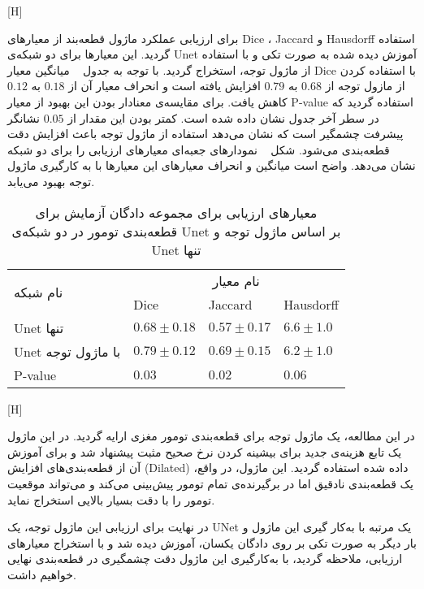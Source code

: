 [H]

برای ارزیابی عملکرد ماژول قطعه‌بند از معیارهای Dice ، Jaccard و Hausdorff استفاده گردید. این معیارها برای دو شبکه‌ی Unet آموزش دیده شده به صورت تکی و با استفاده از ماژول توجه، استخراج گردید. با توجه به جدول ~ میانگین معیار Dice با استفاده کردن از مازول توجه از $0.68$ به $0.79$ افزایش یافته است و انحراف معیار آن از $0.18$ به $0.12$ کاهش یافت. برای مقایسه‌ی معنادار بودن این بهبود از معیار P-value استفاده گردید که در سطر آخر جدول نشان داده شده است. کمتر بودن این مقدار از $0.05$ نشانگر پیشرفت چشمگیر است که نشان می‌دهد استفاده از ماژول توجه باعث افزایش دقت قطعه‌بندی می‌شود. شکل ~ نمودارهای جعبه‌ای معیارهای ارزیابی را برای دو شبکه نشان می‌دهد. واضح است میانگین و انحراف معیارهای این معیارها با به کارگیری ماژول توجه بهبود می‌یابد.

\begin{table}[H]
	\caption{معیارهای ارزیابی برای مجموعه دادگان آزمایش برای قطعه‌بندی تومور در دو شبکه‌ی Unet بر اساس ماژول توجه و Unet تنها}
	\label{attable}
\begin{tabular}{llll}
	\hline
	\multirow{2}{*}{نام شبکه} & \multicolumn{3}{c}{نام معیار}                     \\ \cline{2-4} 
	& Dice  & Jaccard  & Hausdorff    \\ \hline
	Unet تنها     & $0.68 \pm 0.18$ & $0.57 \pm 0.17$   & $6.6 \pm 1.0 $           \\ \hline
	Unet با ماژول توجه      & $0.79 \pm 0.12$ & $0.69 \pm 0.15$   & $6.2 \pm 1.0$            \\ \hline
	P-value                      & $0.03 $       & $0.02 $         & $0.06$                 \\ \hline
\end{tabular}
\end{table}


[H]


در این مطالعه، یک ماژول توجه برای قطعه‌بندی تومور مغزی ارایه گردید. در این ماژول یک تابع هزینه‌ی جدید برای بیشینه کردن نرخ صحیح مثبت پیشنهاد شد و برای آموزش آن از قطعه‌بندی‌های افزایش (Dilated) داده شده استفاده گردید. این ماژول، در واقع، یک قطعه‌بندی نادقیق اما در برگیرنده‌ی تمام تومور پیش‌بینی می‌کند و می‌تواند موقعیت تومور را با دقت بسیار بالایی استخراج نماید. 

در نهایت برای ارزیابی این ماژول توجه، یک UNet یک مرتبه با به‌کار گیری این ماژول و بار دیگر به صورت تکی بر روی دادگان یکسان، آموزش دیده شد و با استخراج معیارهای ارزیابی، ملاحظه گردید، با به‌کارگیری این ماژول دقت چشمگیری در قطعه‌بندی نهایی خواهیم داشت.

